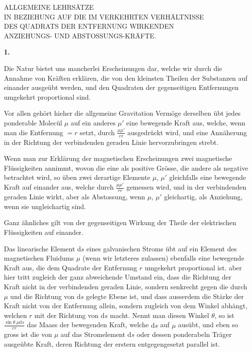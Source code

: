 \clearpage
{}
\renewcommand{\Article}[1]{\par\medskip\Needspace{4\baselineskip}\pdfbookmark[1]{Art. #1}{lehrsaetze-art-#1}\centerline{\textbf{#1.}}\nobreak\smallskip}
\begin{center}
ALLGEMEINE LEHRSÄTZE\\
IN BEZIEHUNG AUF DIE IM VERKEHRTEN VERHÄLTNISSE\\
DES QUADRATS DER ENTFERNUNG WIRKENDEN\\
ANZIEHUNGS- UND ABSTOSSUNGS-KRÄFTE.
\end{center}
\Article{1}
Die Natur bietet uns mancherlei Erscheinungen dar, welche wir durch die Annahme von Kräften erklären, die von den kleinsten Theilen der Substanzen auf einander ausgeübt werden, und den Quadraten der gegenseitigen Entfernungen umgekehrt proportional sind.

Vor allen gehört hieher die allgemeine Gravitation Vermöge derselben übt jedes ponderable Molecül $\mu$ auf ein anderes $\mu'$ eine bewegende Kraft aus, welche, wenn man die Entfernung $=r$ setzt, durch $\frac{\mu\mu'}{rr}$ ausgedrückt wird, und eine Annäherung in der Richtung der verbindenden geraden Linie hervorzubringen strebt.

Wenn man zur Erklärung der magnetischen Erscheinungen zwei magnetische Flüssigkeiten annimmt, wovon die eine als positive Grösse, die andere als negative betrachtet wird, so üben zwei derartige Elemente $\mu$, $\mu'$ gleichfalls eine bewegende Kraft auf einander aus, welche durch $\frac{\mu\mu'}{rr}$ gemessen wird, und in der verbindenden geraden Linie wirkt, aber als Abstossung, wenn $\mu$, $\mu'$ gleichartig, als Anziehung, wenn sie ungleichartig sind.

Ganz ähnliches gilt von der gegenseitigen Wirkung der Theile der elektrischen Flüssigkeiten auf einander.

Das linearische Element $\mathrm{d}s$ eines galvanischen Stroms übt auf ein Element des magnetischen Fluidums $\mu$ (wenn wir letzteres zulassen) ebenfalls eine bewegende Kraft aus, die dem Quadrate der Entfernung $r$ umgekehrt proportional ist. aber hier tritt zugleich der ganz abweichende Umstand ein, dass die Richtung der Kraft nicht in der verbindenden geraden Linie, sondern senkrecht gegen die durch $\mu$ und die Richtung von $\mathrm{d}s$ gelegte Ebene ist, und dass ausserdem die Stärke der Kraft nicht von der Entfernung allein, sondern zugleich von dem Winkel abhängt, welchen $r$ mit der Richtung von $\mathrm{d}s$ macht. Nennt man diesen Winkel $\theta$, so ist $\frac{\sin\theta.\mu\mathrm{d}s}{rr}$ das Maass der bewegenden Kraft, welche $\mathrm{d}s$ auf $\mu$ ausübt, und eben so gross ist die von $\mu$ auf das Stromelement $\mathrm{d}s$ oder dessen ponderabeln Träger ausgeübte Kraft, deren Richtung der erstern entgegengesetzt parallel ist.

